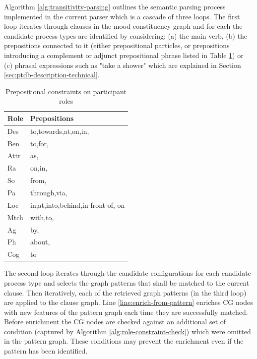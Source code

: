 Algorithm \ref{alg:transitivity-parsing} outlines the semantic parsing process implemented in the current parser which is a cascade of three loops. The first loop iterates through clauses in the mood constituency graph and for each the candidate process types are identified by considering: (a) the main verb, (b) the prepositions connected to it (either prepositional particles, or prepositions introducing a complement or adjunct prepositional phrase listed in Table \ref{tab:participant-roles-constraints}) or (c) phrasal expressions such as "take a shower" which are explained in Section \ref{sec:ptdb-description-technical}.

\begin{table}[!ht]
	\centering
	\begin{tabular}{|l|l|}
		\hline
		\textbf{Role} & \textbf{Prepositions}             \\ \hline
		Des           & to,towards,at,on,in,              \\ \hline
		Ben           & to,for,                           \\ \hline
		Attr          & as,                               \\ \hline
		Ra            & on,in,                            \\ \hline
		So            & from,                             \\ \hline
		Pa            & through,via,                      \\ \hline
		Loc           & in,at,into,behind,in front of, on \\ \hline
		Mtch          & with,to,                          \\ \hline
		Ag            & by,                               \\ \hline
		Ph            & about,                            \\ \hline
		Cog           & to                                \\ \hline
	\end{tabular}
	\caption{Prepositional constraints on participant roles }
	\label{tab:participant-roles-constraints}
\end{table}



The second loop iterates through the candidate configurations for each candidate process type and selects the graph patterns that shall be matched to the current clause. Then iteratively, each of the retrieved graph patterns (in the third loop) are applied to the clause graph. Line \ref{line:enrich-from-pattern} enriches CG nodes with new features of the pattern graph each time they are successfully matched. 
Before enrichment the CG nodes are checked against an additional set of condition (captured by Algorithm \ref{alg:role-constraint-check}) which were omitted in the pattern graph. These conditions may prevent the enrichment even if the pattern has been identified. 

